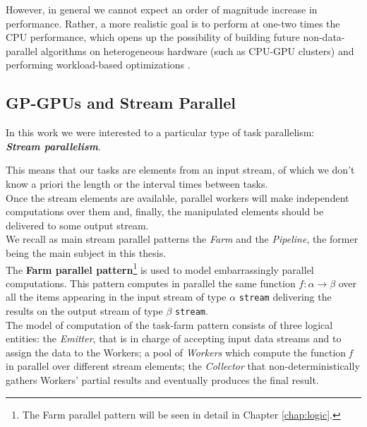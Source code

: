 	However, in general we cannot expect an order of magnitude increase in performance. Rather, a more realistic goal is to perform at one-two times the CPU performance, which opens up the possibility of building future non-data-parallel algorithms on heterogeneous hardware (such as CPU-GPU clusters) and performing workload-based optimizations \cite{backtrack}.
 

\subsection{GP-GPUs and Stream Parallel}
\label{subs:gpgpustreampar}
	In this work we were interested to a particular type of task parallelism:\\
	\textbf{\textit{Stream parallelism}}.
	
	This means that our tasks are elements from an input stream, of which we don't know a priori the length or the interval times between tasks.\\
	Once the stream elements are available, parallel workers will make independent computations over them and, finally, the manipulated elements should be delivered to some output stream.\\
	We recall as main stream parallel patterns the \textit{Farm} and the \textit{Pipeline}, the former being the main subject in this thesis.\\
	
	The \textbf{Farm parallel pattern}\footnote{The Farm parallel pattern will be seen in detail in Chapter \ref{chap:logic}.} is used to model embarrassingly parallel computations. 	
	This pattern computes in parallel the same function \(f:\alpha\rightarrow\beta\) over all the items appearing in the input stream of type \(\alpha\) \texttt{stream} delivering the results on the output stream of type \(\beta\) \texttt{stream}.\\
	The model of computation of the task-farm pattern consists of three logical entities: the \textit{Emitter}, that is in charge of accepting input data streams and to assign the data to the Workers; a pool of \textit{Workers} which compute the function \textit{f} in  parallel over different stream elements; the \textit{Collector} that non-deterministically gathers Workers' partial results and eventually produces the final result.
	
